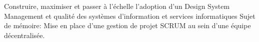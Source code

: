 \documentclass[
	a4paper,
	maincolor=re,
	sidecolor=bg-2,
	sidetextcolor=tex-3,
	sectioncolor=re,
	subsectioncolor=tex-2,
	itemtextcolor=tex-3,
	profilepicsize=3.5cm,
	profilepicborderwidth=2pt,
	datecolwidth=0pt,
]{fortysecondscv}
\begin{document}
\begin{cvtable}
		{Construire, maximiser et passer à l'échelle l’adoption d’un Design
		System\newline}
		{Management et qualité des systèmes d’information et services informatiques\newline}
		{Sujet de mémoire: Mise en place d'une gestion de projet SCRUM au sein 
        d'une équipe décentralisée.\newline}
\end{cvtable}

\newpage
\makebacksidebar
\end{document}
